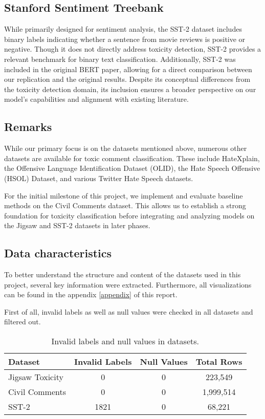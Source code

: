 \subsection{Stanford Sentiment Treebank}
While primarily designed for sentiment analysis, the SST-2 dataset includes binary labels indicating whether a sentence from movie reviews is positive or negative. Though it does not directly address toxicity detection, SST-2 provides a relevant benchmark for binary text classification. Additionally, SST-2 was included in the original BERT paper, allowing for a direct comparison between our replication and the original results. Despite its conceptual differences from the toxicity detection domain, its inclusion ensures a broader perspective on our model's capabilities and alignment with existing literature.

\subsection{Remarks}
While our primary focus is on the datasets mentioned above, numerous other datasets are available for toxic comment classification. These include HateXplain, the Offensive Language Identification Dataset (OLID), the Hate Speech Offensive (HSOL) Dataset, and various Twitter Hate Speech datasets.

For the initial milestone of this project, we implement and evaluate baseline methods on the Civil Comments dataset. This allows us to establish a strong foundation for toxicity classification before integrating and analyzing models on the Jigsaw and SST-2 datasets in later phases.

\subsection{Data characteristics}
To better understand the structure and content of the datasets used in this project, several key information were extracted. Furthermore, all visualizations can be found in the appendix \ref{appendix} of this report.

First of all, invalid labels as well as null values were checked in all datasets and filtered out.

\begin{table}[h!]
\centering
\begin{tabular}{lccc}
\textbf{Dataset} & \textbf{Invalid Labels} & \textbf{Null Values} & \textbf{Total Rows} \\
\hline
\rowcolor{gray!10}
Jigsaw Toxicity & 0 & 0 & 223,549 \\
Civil Comments & 0 & 0 & 1,999,514 \\
\rowcolor{gray!10}
SST-2 & 1821 & 0 & 68,221 \\
\end{tabular}
\caption{Invalid labels and null values in datasets.}
\label{tab:dataset_info}
\end{table}

